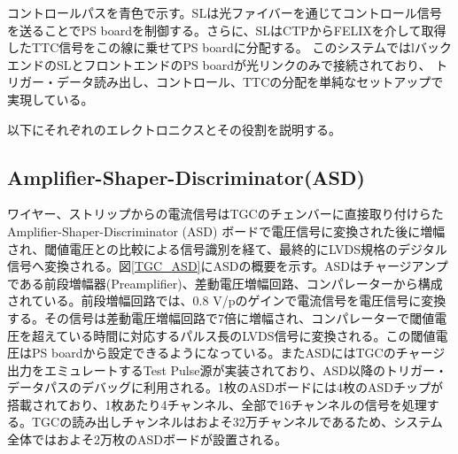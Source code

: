 コントロールパスを青色で示す。SLは光ファイバーを通じてコントロール信号を送ることでPS boardを制御する。さらに、SLはCTPからFELIXを介して取得したTTC信号をこの線に乗せてPS boardに分配する。
このシステムではlバックエンドのSLとフロントエンドのPS boardが光リンクのみで接続されており、
トリガー・データ読み出し、コントロール、TTCの分配を単純なセットアップで実現している。

以下にそれぞれのエレクトロニクスとその役割を説明する。

        \subsection*{Amplifier-Shaper-Discriminator(ASD)}
    ワイヤー、ストリップからの電流信号はTGCのチェンバーに直接取り付けらたAmplifier-Shaper-Discriminator (ASD) ボードで電圧信号に変換された後に増幅され、閾値電圧との比較による信号識別を経て、最終的にLVDS規格のデジタル信号へ変換される。図\ref{TGC_ASD}にASDの概要を示す。ASDはチャージアンプである前段増幅器(Preamplifier)、差動電圧増幅回路、コンパレーターから構成されている。前段増幅回路では、0.8 V/pのゲインで電流信号を電圧信号に変換する。その信号は差動電圧増幅回路で7倍に増幅され、コンパレーターで閾値電圧を超えている時間に対応するパルス長のLVDS信号に変換される。この閾値電圧はPS boardから設定できるようになっている。またASDにはTGCのチャージ出力をエミュレートするTest Pulse源が実装されており、ASD以降のトリガー・データパスのデバッグに利用される。1枚のASDボードには4枚のASDチップが搭載されており、1枚あたり4チャンネル、全部で16チャンネルの信号を処理する。TGCの読み出しチャンネルはおよそ32万チャンネルであるため、システム全体ではおよそ2万枚のASDボードが設置される。

